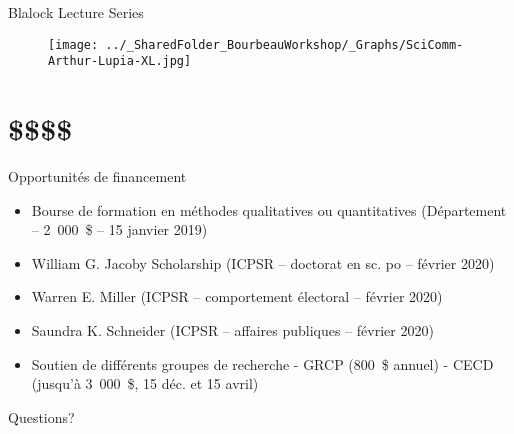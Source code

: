 \documentclass{beamer}
\begin{document}
\begin{frame}{Blalock Lecture Series}

\begin{figure}
    \centering
    \texttt{[image: ../\_SharedFolder\_BourbeauWorkshop/\_Graphs/SciComm-Arthur-Lupia-XL.jpg]}
    \label{fig:my_label3}
\end{figure}
\end{frame}


\section{\$\$\$\$}

\begin{frame}{Opportunités de financement}

\begin{itemize}
    \item Bourse de formation en méthodes qualitatives ou quantitatives (Département -- 2~000~\$ -- 15 janvier 2019)
    \item William G. Jacoby Scholarship (ICPSR -- doctorat en sc. po -- février 2020)
    \item Warren E. Miller (ICPSR -- comportement électoral -- février 2020) 
    \item Saundra K. Schneider (ICPSR -- affaires publiques -- février 2020)
    \item Soutien de différents groupes de recherche \newline
    - GRCP (800~\$ annuel) \newline
    - CECD (jusqu'à 3~000~\$, 15 déc. et 15 avril) 
\end{itemize}

\end{frame}

\begin{frame}{Questions?}
\end{frame}

  
\end{document}

